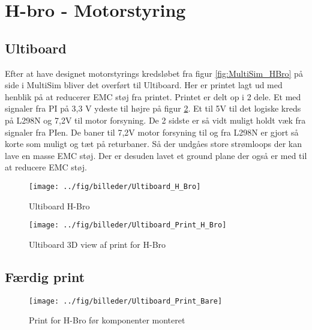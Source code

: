 
\section{H-bro - Motorstyring}





\subsection{Ultiboard}

Efter at have designet motorstyrings kredsløbet fra figur \ref{fig:MultiSim_HBro} på side \pageref{fig:MultiSim_HBro} i MultiSim bliver det overført til Ultiboard. Her er printet lagt ud med henblik på at reducerer EMC støj fra printet. Printet er delt op i 2 dele. Et med signaler fra PI på 3,3 V ydeste til højre på figur \ref{fig:Ultiboard_Print_H_Bro}. Et til 5V til det logiske kreds på L298N og 7,2V til motor forsyning. De 2 sidste er så vidt muligt holdt væk fra signaler fra PIen. De baner til 7,2V motor forsyning til og fra L298N er gjort så korte som muligt og tæt på returbaner. Så der undgåes store strømloops der kan lave en masse EMC støj. Der er desuden lavet et ground plane der også er med til at reducere EMC støj.

\begin{figure}[h]
	\centering
	\texttt{[image: ../fig/billeder/Ultiboard\_H\_Bro]}
	\label{fig:Ultiboard_H_Bro}
	\caption{Ultiboard H-Bro}
\end{figure}


\begin{figure}[h]
	\centering
	\texttt{[image: ../fig/billeder/Ultiboard\_Print\_H\_Bro]}
	\label{fig:Ultiboard_Print_H_Bro}
	\caption{Ultiboard 3D view af print for H-Bro}
\end{figure}


\subsection*{Færdig print}



\begin{figure}[h]
	\centering
	\texttt{[image: ../fig/billeder/Ultiboard\_Print\_Bare]}
	\label{fig:Ultiboard_Print_H_Bro_Bare}
	\caption{Print for H-Bro før komponenter monteret}
\end{figure}

